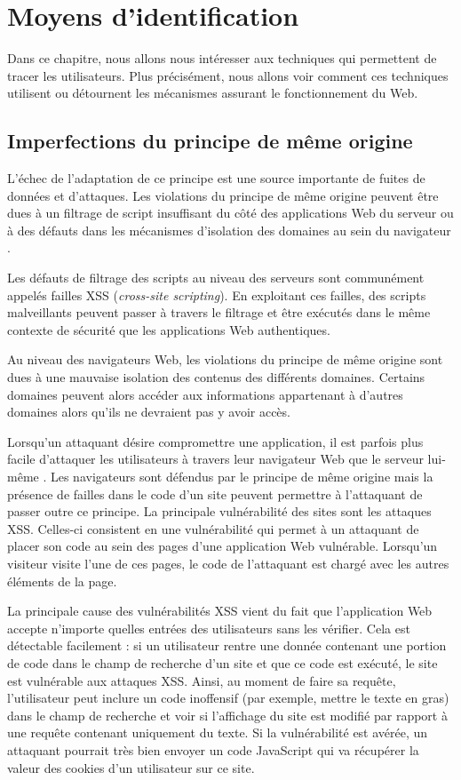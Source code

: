 \chapter{Moyens d'identification}
Dans ce chapitre, nous allons nous intéresser aux techniques qui permettent de tracer les utilisateurs. Plus précisément, nous allons voir comment ces techniques utilisent ou détournent les mécanismes assurant le fonctionnement du Web.

\section{Imperfections du principe de même origine}
L'échec de l'adaptation de ce principe est une source importante de fuites de données et d'attaques. Les violations du principe de même origine peuvent être dues à un filtrage de script insuffisant du côté des applications Web du serveur ou à des défauts dans les mécanismes d'isolation des domaines au sein du navigateur \cite{Chen:2007:ABD:1315245.1315248}.

Les défauts de filtrage des scripts au niveau des serveurs sont communément appelés failles XSS (\textit{cross-site scripting}). En exploitant ces failles, des scripts malveillants peuvent passer à travers le filtrage et être exécutés dans le même contexte de sécurité que les applications Web authentiques.

Au niveau des navigateurs Web, les violations du principe de même origine sont dues à une mauvaise isolation des contenus des différents domaines. Certains domaines peuvent alors accéder aux informations appartenant à d'autres domaines alors qu'ils ne devraient pas y avoir accès.
\newline

Lorsqu'un attaquant désire compromettre une application, il est parfois plus facile d'attaquer les utilisateurs à travers leur navigateur Web que le serveur lui-même \cite{sullivan2011web}. Les navigateurs sont défendus par le principe de même origine mais la présence de failles dans le code d'un site peuvent permettre à l'attaquant de passer outre ce principe. La principale vulnérabilité des sites sont les attaques XSS. Celles-ci consistent en une vulnérabilité qui permet à un attaquant de placer son code au sein des pages d'une application Web vulnérable. Lorsqu'un visiteur visite l'une de ces pages, le code de l'attaquant est chargé avec les autres éléments de la page.

La principale cause des vulnérabilités XSS vient du fait que l'application Web accepte n'importe quelles entrées des utilisateurs sans les vérifier. Cela est détectable facilement : si un utilisateur rentre une donnée contenant une portion de code dans le champ de recherche d'un site et que ce code est exécuté, le site est vulnérable aux attaques XSS. Ainsi, au moment de faire sa requête, l'utilisateur peut inclure un code inoffensif (par exemple, mettre le texte en gras) dans le champ de recherche et voir si l'affichage du site est modifié par rapport à une requête contenant uniquement du texte. Si la vulnérabilité est avérée, un attaquant pourrait très bien envoyer un code JavaScript qui va récupérer la valeur des cookies d'un utilisateur sur ce site.

